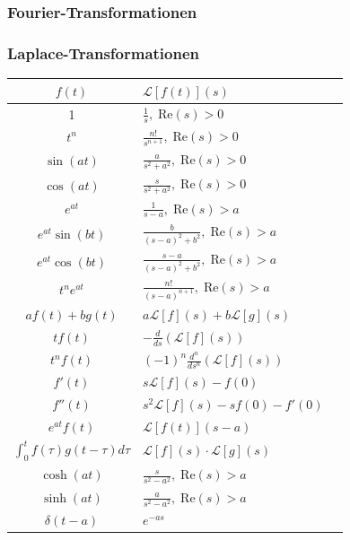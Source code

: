 \documentclass[a4paper,10pt]{article}
\def\Re{\text{Re}}
\begin{document}
\subsubsection{Fourier-Transformationen}

\subsubsection{Laplace-Transformationen}

\begin{center}
  \begin{tabularx}{\linewidth}{c>{\centering\arraybackslash}Xc}
  \toprule
  $f(t)$ & $\mathcal{L}[f(t)](s)$ \\
  \midrule
  1 & $\frac{1}{s}, \; \Re(s) >  0$ \\
  $t^n$ & $\frac{n!}{s^{n+1}}, \; \Re(s) >  0$ \\
  $\sin(at)$ & $\frac{a}{s^2 + a^2}, \; \Re(s) >  0$ \\
  $\cos(at)$ & $\frac{s}{s^2 + a^2}, \; \Re(s) >  0$ \\
  $e^{at}$ & $\frac{1}{s-a}, \; \Re(s) >  a$ \\
  $e^{at} \sin(bt)$ & $\frac{b}{(s-a)^2 + b^2}, \; \Re(s) >  a$ \\
  $e^{at} \cos(bt)$ & $\frac{s-a}{(s-a)^2 + b^2}, \; \Re(s) >  a$ \\
  $t^n e^{at}$ & $\frac{n!}{(s-a)^{n+1}}, \; \Re(s) >  a$ \\
  $a f(t) + b g(t)$ & $a \mathcal{L}[f](s) + b \mathcal{L}[g](s)$ \\
  $t f(t)$ & $-\frac{d}{ds} \left( \mathcal{L}[f](s) \right)$ \\
  $t^n f(t)$ & $(-1)^n \frac{d^n}{ds^n} \left( \mathcal{L}[f](s) \right)$ \\
  $f'(t)$ & $s \mathcal{L}[f](s) - f(0)$ \\
  $f''(t)$ & $s^2 \mathcal{L}[f](s) - s f(0) - f'(0)$ \\
  $e^{at} f(t)$ & $\mathcal{L}[f(t)](s - a)$ \\
  $\int_0^t f(\tau) g(t-\tau) d\tau$ & $\mathcal{L}[f](s) \cdot \mathcal{L}[g](s)$ \\
  $\cosh(at)$ & $\frac{s}{s^2 - a^2}, \; \Re(s) >  a$\\
  $\sinh(at)$ & $\frac{a}{s^2 - a^2}, \; \Re(s) >  a$\\
  $\delta(t - a)$ & $e^{-as}$\\
  \bottomrule
  \end{tabularx}
\end{center}
\begin{table}[h!]
  \begin{tabular}{|c|c|}
  \hline

  \hline
  \end{tabular}
\end{table}
\end{document}
